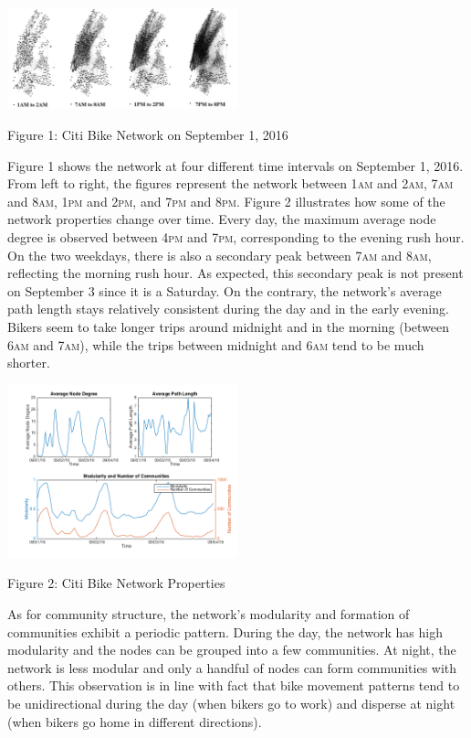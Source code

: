 \documentclass[times, 10pt,twocolumn]{article}
\begin{document}
\centerline{\includegraphics[width=0.5\textwidth]{m2/combined.jpg}}
\centerline{Figure 1: Citi Bike Network on September 1, 2016}
\hfill \break
\indent Figure 1 shows the network at four different time intervals on September 1, 2016. From left to right, the figures represent the network between 1\textsc{am} and 2\textsc{am}, 7\textsc{am} and 8\textsc{am}, 1\textsc{pm} and 2\textsc{pm}, and 7\textsc{pm} and 8\textsc{pm}. Figure 2 illustrates how some of the network properties change over time. Every day, the maximum average node degree is observed between 4\textsc{pm} and 7\textsc{pm}, corresponding to the evening rush hour. On the two weekdays, there is also a secondary peak between 7\textsc{am} and 8\textsc{am}, reflecting the morning rush hour. As expected, this secondary peak is not present on September 3 since it is a Saturday. On the contrary, the network's average path length stays relatively consistent during the day and in the early evening. Bikers seem to take longer trips around midnight and in the morning (between 6\textsc{am} and 7\textsc{am}), while the trips between midnight and 6\textsc{am} tend to be much shorter.

\centerline{\includegraphics[width=0.5\textwidth]{m2/plotterfigure.png}}
\centerline{Figure 2: Citi Bike Network Properties}
\hfill \break
\indent As for community structure, the network's modularity and formation of communities exhibit a periodic pattern. During the day, the network has high modularity and the nodes can be grouped into a few communities. At night, the network is less modular and only a handful of nodes can form communities with others. This observation is in line with fact that bike movement patterns tend to be unidirectional during the day (when bikers go to work) and disperse at night (when bikers go home in different directions).
\end{document}
